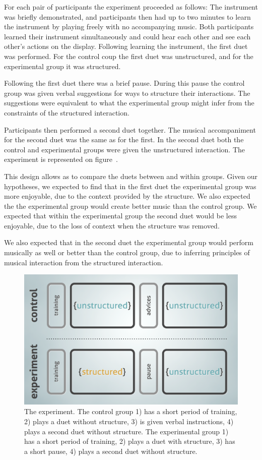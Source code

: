\documentclass{article}
\begin{document}
For each pair of participants the experiment proceeded as follows: The instrument was briefly demonstrated, and participants then had up to two minutes to learn the instrument by playing freely with no accompanying music.  Both participants learned their instrument simultaneously and could hear each other and see each other's actions on the display.  Following learning the instrument, the first duet was performed.  For the control coup the first duet was unstructured, and for the experimental group it was structured.
 
Following the first duet there was a brief pause.  During this pause the control group was given verbal suggestions for ways to structure their interactions.  The suggestions were equivalent to what the experimental group might infer from the constraints of the structured interaction.

Participants then performed a second duet together.  The musical accompaniment for the second duet was the same as for the first.  In the second duet both the control and experimental groups were given the unstructured interaction. The experiment is represented on figure~\cite{experiment}.

This design allows as to compare the duets between and within groups.  Given our hypotheses, we expected to find that in the first duet the experimental group was more enjoyable, due to the context provided by the structure. We also expected the the experimental group would create better music than the control group. We expected that within the experimental group the second duet would be less enjoyable, due to the loss of context when the structure was removed.  

We also expected that in the second duet the experimental group would perform musically as well or better than the control group, due to inferring principles of musical interaction from the structured interaction.

\begin{figure}[tb]
\includegraphics[width=\columnwidth]{exp.png}
\caption{The experiment. The control group 1) has a short period of training, 2) plays a duet without structure, 3) is given verbal instructions, 4) plays a second duet without structure. The experimental group 1) has a short period of training, 2) plays a duet with structure, 3) has a short pause, 4) plays a second duet without structure.}
\label{experiment}
\end{figure}
\end{document}
